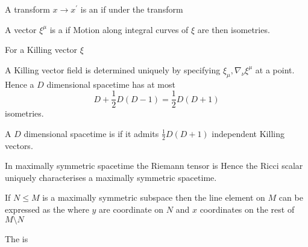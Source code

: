 \documentclass{article}
\begin{document}
\begin{definition}[Isometry]
A transform $x \to x^\prime$ is an  if under the transform 
\end{definition}

\begin{definition}
A vector $\xi^\mu$ is a  if 
Motion along integral curves of $\xi$ are then isometries. 
\end{definition}

\begin{prop}
For a Killing vector $\xi$
\end{prop}
\begin{corollary}
A Killing vector field  is determined uniquely by specifying $\xi_\mu ,\nabla_\nu \xi^\mu$ at a point. Hence a $D$ dimensional spacetime has at most 
\[
D + \frac{1}{2}D(D-1) = \frac{1}{2}D(D+1)
\]
isometries. 
\end{corollary}

\begin{definition}
A $D$ dimensional spacetime is  if it admits $\frac{1}{2}D(D+1)$ independent Killing vectors. 
\end{definition}

\begin{prop}
In maximally symmetric spacetime the Riemann tensor is 
Hence the Ricci scalar uniquely characterises a maximally symmetric spacetime. 
\end{prop}

\begin{fact}
If $N\leq M$ is a maximally symmetric subspace then the line element on $M$ can be expressed as the 
where $y$ are coordinate on $N$ and $x$ coordinates on the rest of $M\setminus N$
\end{fact}

\begin{definition}\label{def:CSM:EinsteinHilbertAction}
The  is 
\end{definition}
\end{document}
